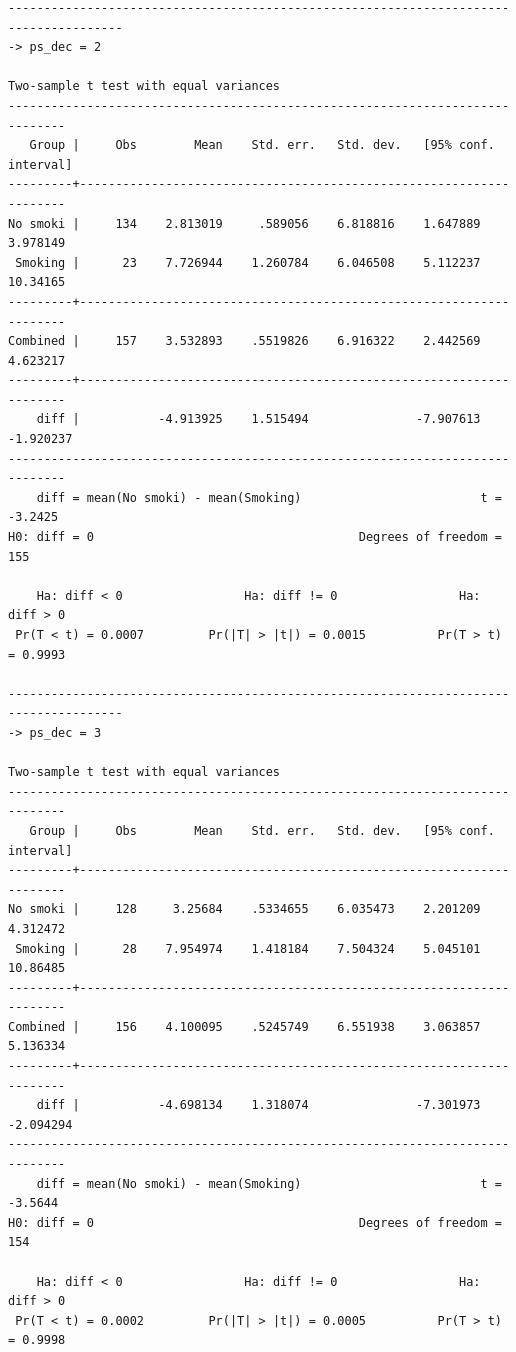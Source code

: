 \documentclass[
  10pt,
  a4paper,
]{book}
\begin{document}
\begin{verbatim}
--------------------------------------------------------------------------------------
-> ps_dec = 2

Two-sample t test with equal variances
------------------------------------------------------------------------------
   Group |     Obs        Mean    Std. err.   Std. dev.   [95% conf. interval]
---------+--------------------------------------------------------------------
No smoki |     134    2.813019     .589056    6.818816    1.647889    3.978149
 Smoking |      23    7.726944    1.260784    6.046508    5.112237    10.34165
---------+--------------------------------------------------------------------
Combined |     157    3.532893    .5519826    6.916322    2.442569    4.623217
---------+--------------------------------------------------------------------
    diff |           -4.913925    1.515494               -7.907613   -1.920237
------------------------------------------------------------------------------
    diff = mean(No smoki) - mean(Smoking)                         t =  -3.2425
H0: diff = 0                                     Degrees of freedom =      155

    Ha: diff < 0                 Ha: diff != 0                 Ha: diff > 0
 Pr(T < t) = 0.0007         Pr(|T| > |t|) = 0.0015          Pr(T > t) = 0.9993

--------------------------------------------------------------------------------------
-> ps_dec = 3

Two-sample t test with equal variances
------------------------------------------------------------------------------
   Group |     Obs        Mean    Std. err.   Std. dev.   [95% conf. interval]
---------+--------------------------------------------------------------------
No smoki |     128     3.25684    .5334655    6.035473    2.201209    4.312472
 Smoking |      28    7.954974    1.418184    7.504324    5.045101    10.86485
---------+--------------------------------------------------------------------
Combined |     156    4.100095    .5245749    6.551938    3.063857    5.136334
---------+--------------------------------------------------------------------
    diff |           -4.698134    1.318074               -7.301973   -2.094294
------------------------------------------------------------------------------
    diff = mean(No smoki) - mean(Smoking)                         t =  -3.5644
H0: diff = 0                                     Degrees of freedom =      154

    Ha: diff < 0                 Ha: diff != 0                 Ha: diff > 0
 Pr(T < t) = 0.0002         Pr(|T| > |t|) = 0.0005          Pr(T > t) = 0.9998


\end{verbatim}
\end{document}
